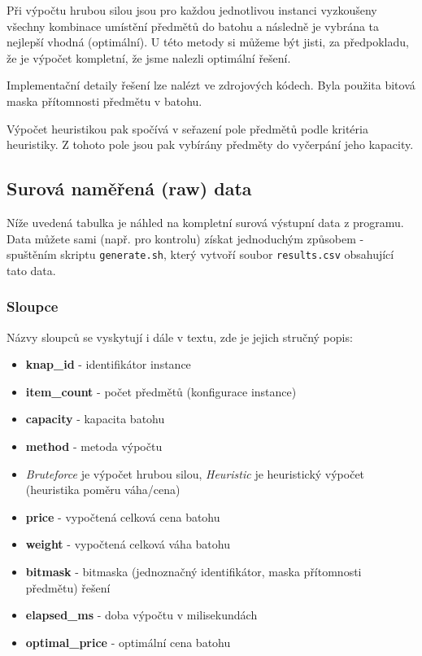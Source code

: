 \documentclass[11pt]{article}
\providecommand{\tightlist}{%
      \setlength{\itemsep}{0pt}\setlength{\parskip}{0pt}}
\begin{document}
Při výpočtu hrubou silou jsou pro každou jednotlivou instanci vyzkoušeny
všechny kombinace umístění předmětů do batohu a následně je vybrána ta
nejlepší vhodná (optimální). U této metody si můžeme být jisti, za
předpokladu, že je výpočet kompletní, že jsme nalezli optimální řešení.

Implementační detaily řešení lze nalézt ve zdrojových kódech. Byla
použita bitová maska přítomnosti předmětu v batohu.

Výpočet heuristikou pak spočívá v seřazení pole předmětů podle kritéria
heuristiky. Z tohoto pole jsou pak vybírány předměty do vyčerpání jeho
kapacity.

    \subsection{Surová naměřená (raw)
data}\label{surovuxe1-namux11bux159enuxe1-raw-data}

Níže uvedená tabulka je náhled na kompletní surová výstupní data z
programu. Data můžete sami (např. pro kontrolu) získat jednoduchým
způsobem - spuštěním skriptu \texttt{generate.sh}, který vytvoří soubor
\texttt{results.csv} obsahující tato data.

\subsubsection{Sloupce}\label{sloupce}

Názvy sloupců se vyskytují i dále v textu, zde je jejich stručný popis:

\begin{itemize}
\tightlist
\item
  \textbf{knap\_id} - identifikátor instance
\item
  \textbf{item\_count} - počet předmětů (konfigurace instance)
\item
  \textbf{capacity} - kapacita batohu
\item
  \textbf{method} - metoda výpočtu
\item
  \emph{Bruteforce} je výpočet hrubou silou, \emph{Heuristic} je
  heuristický výpočet (heuristika poměru váha/cena)
\item
  \textbf{price} - vypočtená celková cena batohu
\item
  \textbf{weight} - vypočtená celková váha batohu
\item
  \textbf{bitmask} - bitmaska (jednoznačný identifikátor, maska
  přítomnosti předmětu) řešení
\item
  \textbf{elapsed\_ms} - doba výpočtu v milisekundách
\item
  \textbf{optimal\_price} - optimální cena batohu
\end{itemize}
\end{document}

